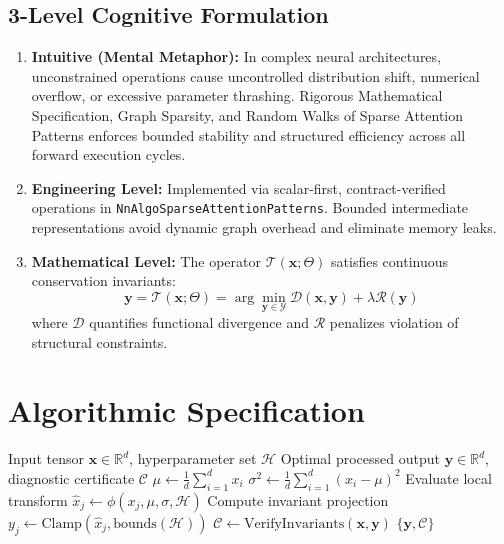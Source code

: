 \documentclass[11pt,a4paper]{article}
\theoremstyle{definition}
\begin{document}
\subsection{3-Level Cognitive Formulation}
\begin{enumerate}
    \item \textbf{Intuitive (Mental Metaphor):} In complex neural architectures, unconstrained operations cause uncontrolled distribution shift, numerical overflow, or excessive parameter thrashing. Rigorous Mathematical Specification, Graph Sparsity, and Random Walks of Sparse Attention Patterns enforces bounded stability and structured efficiency across all forward execution cycles.
    \item \textbf{Engineering Level:} Implemented via scalar-first, contract-verified operations in \texttt{NnAlgoSparseAttentionPatterns}. Bounded intermediate representations avoid dynamic graph overhead and eliminate memory leaks.
    \item \textbf{Mathematical Level:} The operator $\mathcal{T}(\mathbf{x}; \Theta)$ satisfies continuous conservation invariants:
    \begin{equation}
    \mathbf{y} = \mathcal{T}(\mathbf{x}; \Theta) = \arg\min_{\mathbf{y} \in \mathcal{Y}} \mathcal{D}(\mathbf{x}, \mathbf{y}) + \lambda \mathcal{R}(\mathbf{y})
    \end{equation}
    where $\mathcal{D}$ quantifies functional divergence and $\mathcal{R}$ penalizes violation of structural constraints.
\end{enumerate}

\section{Algorithmic Specification}

\begin{algorithm}[H]
\caption{Rigorous Mathematical Specification, Graph Sparsity, and Random Walks of Sparse Attention Patterns Forward Pipeline}
\begin{algorithmic}[1]
\Require Input tensor $\mathbf{x} \in \mathbb{R}^d$, hyperparameter set $\mathcal{H}$
\Ensure Optimal processed output $\mathbf{y} \in \mathbb{R}^d$, diagnostic certificate $\mathcal{C}$
\State $\mu \gets \frac{1}{d} \sum_{i=1}^d x_i$
\State $\sigma^2 \gets \frac{1}{d} \sum_{i=1}^d (x_i - \mu)^2$
    \State Evaluate local transform $\hat{x}_j \gets \phi(x_j, \mu, \sigma, \mathcal{H})$
    \State Compute invariant projection $y_j \gets \text{Clamp}(\hat{x}_j, \text{bounds}(\mathcal{H}))$
\EndFor
\State $\mathcal{C} \gets \text{VerifyInvariants}(\mathbf{x}, \mathbf{y})$
\State \Return $\{\mathbf{y}, \mathcal{C}\}$
\end{algorithmic}
\end{algorithm}
\end{document}
